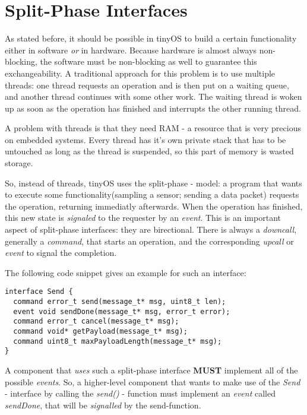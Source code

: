 \section{Split-Phase Interfaces}

As stated before, it should be possible in tinyOS to build a certain functionality either in software \textit{or} in hardware. Because hardware is almost always non-blocking, the software must be non-blocking as well to guarantee this exchangeability. A traditional approach for this problem is to use multiple threads: one thread requests an operation and is then put on a waiting queue, and another thread continues with some other work. The waiting thread is woken up as soon as the operation has finished and interrupts the other running thread.

A problem with threads is that they need RAM - a resource that is very precious on embedded systems. Every thread has it's own private stack that has to be untouched as long as the thread is suspended, so this part of memory is wasted storage.

So, instead of threads, tinyOS uses the split-phase - model: a program that wants to execute some functionality(sampling a sensor; sending a data packet) requests the operation, returning immediatly afterwards. When the operation has finished, this new state is \textit{signaled} to the requester by an \textit{event}. This is an important aspect of split-phase interfaces: they are birectional. There is always a \textit{downcall}, generally a \textit{command}, that starts an operation, and the corresponding \textit{upcall} or \textit{event} to signal the completion. 

The following code snippet gives an example for such an interface:

\lstset{language=C}
\begin{lstlisting}
interface Send {
  command error_t send(message_t* msg, uint8_t len);
  event void sendDone(message_t* msg, error_t error);
  command error_t cancel(message_t* msg);
  command void* getPayload(message_t* msg);
  command uint8_t maxPayloadLength(message_t* msg);
}
\end{lstlisting}

A component that \textit{uses} such a split-phase interface \textbf{MUST} implement all of the possible \textit{events}. So, a higher-level component that wants to make use of the \textit{Send} - interface by calling the \textit{send()} - function must implement an \textit{event} called \textit{sendDone}, that will be \textit{signalled} by the send-function.

